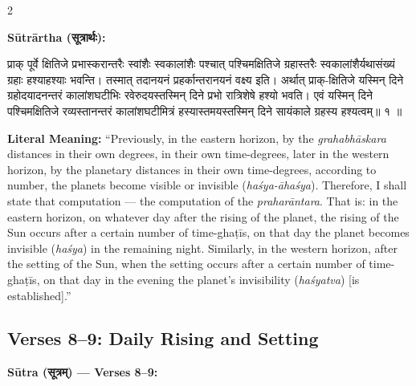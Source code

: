 \documentclass[11pt,a4paper]{article}
\newcommand{\dev}[1]{{\devanagarifont #1}}
\newenvironment{sanskritverse}{%
  \begin{center}\begin{minipage}{0.95\textwidth}
  \setlength{\leftskip}{1em}
  \setlength{\rightskip}{1em}
  \dev
}{\end{minipage}\end{center}}
\begin{document}
\vspace{0.5em}

\begin{paracol}{2}

\noindent\textbf{Sūtrārtha (\dev{सूत्रार्थः}):}
\begin{sanskritverse}
प्राक् पूर्वे क्षितिजे प्रभास्करान्तरैः स्वांशैः स्वकालांशैः पश्चात् पश्चिमक्षितिजे
ग्रहास्तरैः स्वकालांशैर्यथासंख्यं ग्रहाः हश्याहश्याः भवन्ति। तस्मात् तदानयनं
प्रहर्कान्तरानयनं वक्ष्य इति। अर्थात् प्राक्-क्षितिजे यस्मिन् दिने ग्रहोदयादनन्तरं
कालांशघटीभिः रवेरुदयस्तस्मिन् दिने प्रभो रात्रिशेषे हश्यो भवति। एवं यस्मिन् दिने
पश्चिमक्षितिजे रव्यस्तानन्तरं कालांशघटीमित्रं हस्यास्तमयस्तस्मिन् दिने सायंकाले
ग्रहस्य हश्यत्वम्॥ १ ॥
\end{sanskritverse}

\switchcolumn

\textbf{Literal Meaning:} ``Previously, in the eastern horizon, by the \textit{grahabhāskara} distances in their own degrees, in their own time-degrees, later in the western horizon, by the planetary distances in their own time-degrees, according to number, the planets become visible or invisible (\textit{haśya-āhaśya}). Therefore, I shall state that computation --- the computation of the \textit{praharāntara}. That is: in the eastern horizon, on whatever day after the rising of the planet, the rising of the Sun occurs after a certain number of time-ghaṭīs, on that day the planet becomes invisible (\textit{haśya}) in the remaining night. Similarly, in the western horizon, after the setting of the Sun, when the setting occurs after a certain number of time-ghaṭīs, on that day in the evening the planet's invisibility (\textit{haśyatva}) [is established].''

\end{paracol}

\subsection{Verses 8--9: Daily Rising and Setting}

\vspace{0.5em}
\noindent\textbf{Sūtra (\dev{सूत्रम्}) — Verses 8--9:}
\end{document}
